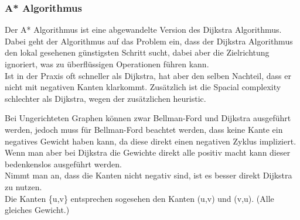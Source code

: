 \documentclass[
../AuD-Zusammenfassung.tex,
]
{subfiles}
\begin{document}
\subsubsection{A* Algorithmus}
Der A* Algorithmus ist eine abgewandelte Version des Dijkstra Algorithmus. Dabei geht der Algorithmus auf das Problem ein, dass der Dijkstra Algorithmus den lokal gesehenen günstigsten Schritt sucht, dabei aber die Zielrichtung ignoriert, was zu überflüssigen Operationen führen kann.\\
Ist in der Praxis oft schneller als Dijkstra, hat aber den selben Nachteil, dass er nicht mit negativen Kanten klarkommt. Zusätzlich ist die Spacial complexity schlechter als Dijkstra, wegen der zusätzlichen heuristic.\\
\begin{algorithm}[H]
\end{algorithm}
\vspace{20pt}
Bei Ungerichteten Graphen können zwar Bellman-Ford und Dijkstra ausgeführt werden, jedoch muss für Bellman-Ford beachtet werden, dass keine Kante ein negatives Gewicht haben kann, da diese direkt einen negativen Zyklus impliziert. Wenn man aber bei Dijkstra die Gewichte direkt alle positiv macht kann dieser bedenkenslos ausgeführt werden. \\
Nimmt man an, dass die Kanten nicht negativ sind, ist es besser direkt Dijkstra zu nutzen. \\
Die Kanten \{u,v\} entsprechen sogesehen den Kanten (u,v) und (v,u). (Alle gleiches Gewicht.)




\end{document}
